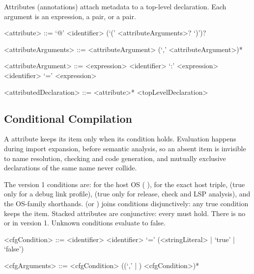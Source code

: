 \documentclass[makeidx]{article}
\begin{document}
\LMHash{}%
Attributes (annotations) attach metadata to a top-level declaration.
Each argument is an expression, a  pair,
or a  pair.

\begin{grammar}
<attribute> ::= `@' <identifier> (`(' <attributeArguments>? `)')?

<attributeArguments> ::= <attributeArgument> (`,' <attributeArgument>)*

<attributeArgument> ::= <expression>
  \alt <identifier> `:' <expression>
  \alt <identifier> `=' <expression>

<attributedDeclaration> ::= <attribute>* <topLevelDeclaration>
\end{grammar}

\subsection{Conditional Compilation}

\LMHash{}%
A  attribute keeps its item only when its condition
holds. Evaluation happens during import expansion, before semantic
analysis, so an absent item is invisible to name resolution, checking
and code generation, and mutually exclusive declarations of the same
name never collide.

\LMHash{}%
The version 1 conditions are:  for the host OS
( \code{|}  \code{|} ),
 for the exact host triple,
 (true only for a debug link profile),
 (true only for release, check and LSP analysis),
and the  \code{|}  OS-family shorthands.
 (or \code{,}) joins conditions disjunctively: any true
condition keeps the item. Stacked attributes are conjunctive: every
 must hold. There is no  or  in version
1. Unknown conditions evaluate to false.

\begin{grammar}
<cfgCondition> ::= <identifier>
  \alt <identifier> `=' (<stringLiteral> | `true' | `false')

<cfgArguments> ::= <cfgCondition> ((`,' | \OR{}) <cfgCondition>)*
\end{grammar}

\end{document}
